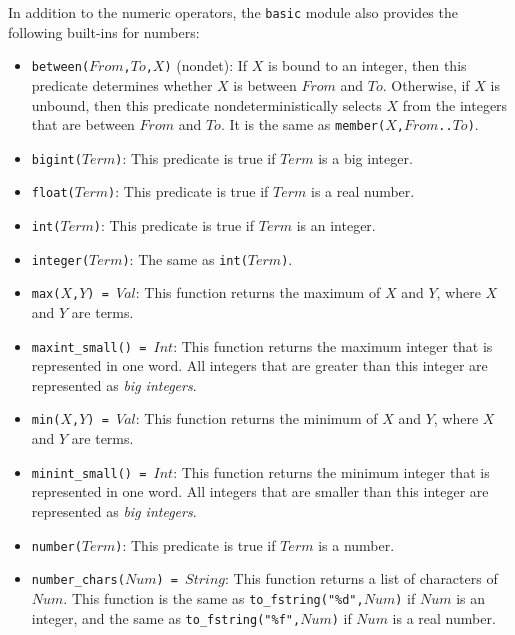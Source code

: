 In addition to the numeric operators, the \texttt{basic} module also provides the following built-ins for numbers:

\begin{itemize}
\item \texttt{between($From$,$To$,$X$)} (nondet): If $X$ is bound to an integer, then this predicate determines whether $X$ is between $From$ and $To$.  Otherwise, if $X$ is unbound, then this predicate nondeterministically selects $X$ from the integers that are between $From$ and $To$. It is the same as \texttt{member($X$,$From$..$To$)}.
\item \texttt{bigint($Term$)}: This predicate is true if $Term$ is a big integer.
\item \texttt{float($Term$)}: This predicate is true if $Term$ is a real number.
\item \texttt{int($Term$)}: This predicate is true if $Term$ is an integer.
\item \texttt{integer($Term$)}: The same as \texttt{int($Term$)}.
\item \texttt{max($X$,$Y$) = $Val$}: This function returns the maximum of $X$ and $Y$, where $X$ and $Y$ are terms.
\item \texttt{maxint\_small() = $Int$}: This function returns the maximum integer that is represented in one word. All integers that are greater than this integer are represented as \textit{big integers}.
\item \texttt{min($X$,$Y$) = $Val$}: This function returns the minimum of $X$ and $Y$, where $X$ and $Y$ are terms.
\item \texttt{minint\_small() = $Int$}: This function returns the minimum integer that is represented in one word. All integers that are smaller than this integer are represented as \textit{big integers}.
\item \texttt{number($Term$)}: This predicate is true if $Term$ is a number.
\item \texttt{number\_chars($Num$) = $String$}: This function returns a list of characters of $Num$. This function is the same as \texttt{to\_fstring("\%d",$Num$)} if $Num$ is an integer, and the same as \texttt{to\_fstring("\%f",$Num$)} if $Num$ is a real number.

\end{itemize}
